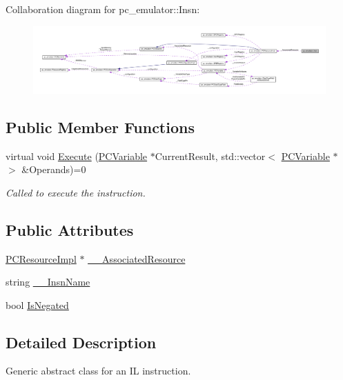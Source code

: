 Collaboration diagram for pc\+\_\+emulator\+:\+:Insn\+:
\nopagebreak
\begin{figure}[H]
\begin{center}
\leavevmode
\includegraphics[width=350pt]{classpc__emulator_1_1Insn__coll__graph}
\end{center}
\end{figure}
\subsection*{Public Member Functions}
\begin{DoxyCompactItemize}
\item 
virtual void \hyperlink{classpc__emulator_1_1Insn_a103d27030e872a799e313df16c1f3d66}{Execute} (\hyperlink{classpc__emulator_1_1PCVariable}{P\+C\+Variable} $\ast$Current\+Result, std\+::vector$<$ \hyperlink{classpc__emulator_1_1PCVariable}{P\+C\+Variable} $\ast$ $>$ \&Operands)=0
\begin{DoxyCompactList}\small\item\em Called to execute the instruction. \end{DoxyCompactList}\end{DoxyCompactItemize}
\subsection*{Public Attributes}
\begin{DoxyCompactItemize}
\item 
\hyperlink{classpc__emulator_1_1PCResourceImpl}{P\+C\+Resource\+Impl} $\ast$ \hyperlink{classpc__emulator_1_1Insn_ae7cb9ec6f9eff913027042ad4e253bd4}{\+\_\+\+\_\+\+Associated\+Resource}
\item 
string \hyperlink{classpc__emulator_1_1Insn_a7921073748a0e77469b19bad52b0518b}{\+\_\+\+\_\+\+Insn\+Name}
\item 
bool \hyperlink{classpc__emulator_1_1Insn_a41aa1d28ef8bcf15ca05faaa1ccea018}{Is\+Negated}
\end{DoxyCompactItemize}


\subsection{Detailed Description}
Generic abstract class for an IL instruction. 

